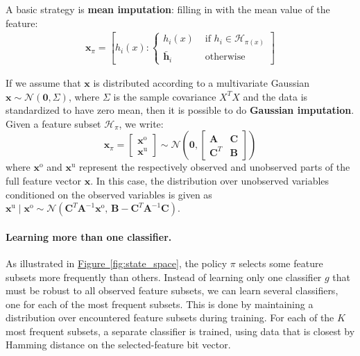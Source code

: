 A basic strategy is \textbf{mean imputation}: filling in with the mean value of the feature:
\begin{align}
\mathbf{x}_\pi = \left[ h_i(x) : \left\{ \begin{array}{rl}
 h_i(x) &\mbox{ if $h_i \in \mathcal{H}_{\pi(x)}$} \\
 \bar{\mathbf{h}}_i &\mbox{ otherwise}
\end{array} \right. \right]
\end{align}

If we assume that $\mathbf{x}$ is distributed according to a multivariate Gaussian $\mathbf{x} \sim \mathcal{N}(\mathbf{0}, \Sigma)$, where $\Sigma$ is the sample covariance $X^T X$ and the data is standardized to have zero mean, then it is possible to do \textbf{Gaussian imputation}.
Given a feature subset $\mathcal{H}_\pi$, we write:
\begin{equation}
\mathbf{x}_\pi = \begin{bmatrix} \mathbf{x}^\text{o}\\  \mathbf{x}^\text{u} \end{bmatrix} \sim \mathcal{N} \left( \mathbf{0}, \begin{bmatrix} \mathbf{A} & \mathbf{C}\\ \mathbf{C}^T & \mathbf{B} \end{bmatrix} \right)
\end{equation}
where $\mathbf{x}^\text{o}$ and $\mathbf{x}^\text{u}$ represent the respectively observed and unobserved parts of the full feature vector $\mathbf{x}$.
In this case, the distribution over unobserved variables conditioned on the observed variables is given as
$\mathbf{x}^\text{u} \mid \mathbf{x}^\text{o} \sim \mathcal{N} \left( \mathbf{C}^T \mathbf{A}^{-1} \mathbf{x}^\text{o},\, \mathbf{B} - \mathbf{C}^T \mathbf{A}^{-1} \mathbf{C} \right)$.

\paragraph{Learning more than one classifier.}
As illustrated in \hyperref[fig:state_space]{Figure~\ref*{fig:state_space}}, the policy $\pi$ selects some feature subsets more frequently than others.
Instead of learning only one classifier $g$ that must be robust to all observed feature subsets, we can learn several classifiers, one for each of the most frequent subsets.
This is done by maintaining a distribution over encountered feature subsets during training.
For each of the $K$ most frequent subsets, a separate classifier is trained, using data that is closest by Hamming distance on the selected-feature bit vector.

